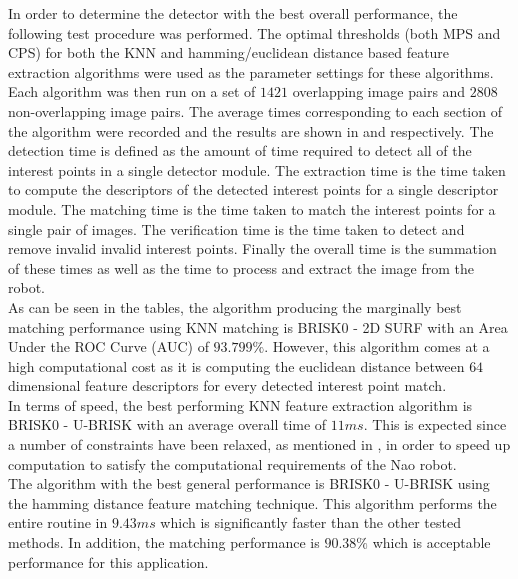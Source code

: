 \documentclass{article}
\begin{document}
In order to determine the detector with the best overall performance, the following test procedure was performed. The optimal thresholds (both MPS and CPS) for both the KNN and hamming/euclidean distance based feature extraction algorithms were used as the parameter settings for these algorithms. Each algorithm was then run on a set of $1421$ overlapping image pairs and $2808$ non-overlapping image pairs. The average times corresponding to each section of the algorithm were recorded and the results are shown in  and  respectively. The detection time is defined as the amount of time required to detect all of the interest points in a single detector module. The extraction time is the time taken to compute the descriptors of the detected interest points for a single descriptor module. The matching time is the time taken to match the interest points for a single pair of images. The verification time is the time taken to detect and remove invalid invalid interest points. Finally the overall time is the summation of these times as well as the time to process and extract the image from the robot. \\

As can be seen in the tables, the algorithm producing the marginally best matching performance using KNN matching is BRISK0 - 2D SURF with an Area Under the ROC Curve (AUC) of $93.799\%$. However, this algorithm comes at a high computational cost as it is computing the euclidean distance between $64$ dimensional feature descriptors for every detected interest point match.\\

In terms of speed, the best performing KNN feature extraction algorithm is BRISK0 - U-BRISK with an average overall time of $11 ms$. This is expected since a number of constraints have been relaxed, as mentioned in , in order to speed up computation to satisfy the computational requirements of the Nao robot.\\

The algorithm with the best general performance is BRISK0 - U-BRISK using the hamming distance feature matching technique. This algorithm performs the entire routine in $9.43 ms$ which is significantly faster than the other tested methods. In addition, the matching performance is $90.38\%$ which is acceptable performance for this application.\\
\end{document}
